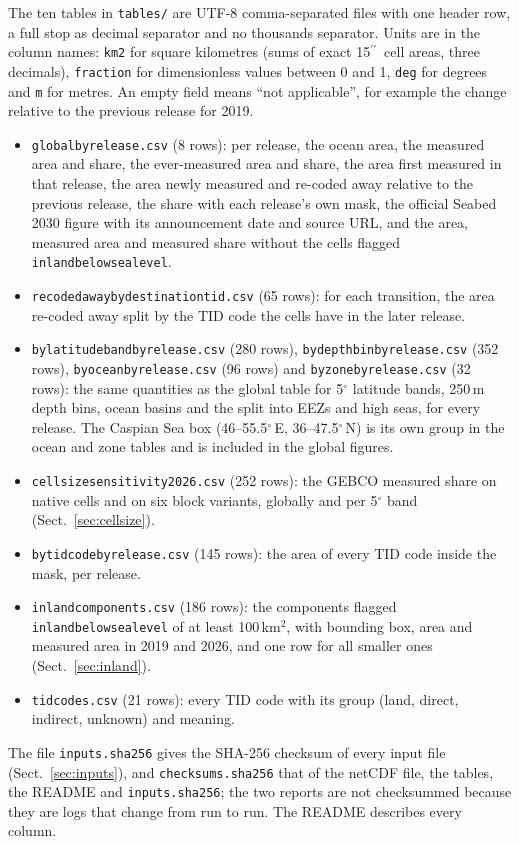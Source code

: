\documentclass[essd, manuscript]{copernicus}
\newcommand{\as}{$^{\prime\prime}$}      %
\renewcommand{\_}{\usorig\allowbreak}
\begin{document}
The ten tables in \texttt{tables/} are UTF-8 comma-separated files with one header row, a full stop as decimal separator and no thousands separator.
Units are in the column names: \texttt{\_km2} for square kilometres (sums of exact 15\as\ cell areas, three decimals), \texttt{\_fraction} for dimensionless values between 0 and 1, \texttt{\_deg} for degrees and \texttt{\_m} for metres.
An empty field means ``not applicable'', for example the change relative to the previous release for 2019.
\begin{itemize}
\item \texttt{global\_by\_release.csv} (8 rows): per release, the ocean area, the measured area and share, the ever-measured area and share, the area first measured in that release, the area newly measured and re-coded away relative to the previous release, the share with each release's own mask, the official Seabed 2030 figure with its announcement date and source URL, and the area, measured area and measured share without the cells flagged \texttt{inland\_below\_sea\_level}.
\item \texttt{recoded\_away\_by\_destination\_tid.csv} (65 rows): for each transition, the area re-coded away split by the TID code the cells have in the later release.
\item \texttt{by\_latitude\_band\_by\_release.csv} (280 rows), \texttt{by\_depth\_bin\_by\_release.csv} (352 rows), \texttt{by\_ocean\_by\_release.csv} (96 rows) and \texttt{by\_zone\_by\_release.csv} (32 rows): the same quantities as the global table for 5$^\circ$ latitude bands, 250\,m depth bins, ocean basins and the split into EEZs and high seas, for every release. The Caspian Sea box (46--55.5$^\circ$\,E, 36--47.5$^\circ$\,N) is its own group in the ocean and zone tables and is included in the global figures.
\item \texttt{cellsize\_sensitivity\_2026.csv} (252 rows): the GEBCO\_2026 measured share on native cells and on six block variants, globally and per 5$^\circ$ band (Sect.~\ref{sec:cellsize}).
\item \texttt{by\_tid\_code\_by\_release.csv} (145 rows): the area of every TID code inside the mask, per release.
\item \texttt{inland\_components.csv} (186 rows): the components flagged \texttt{inland\_below\_sea\_level} of at least 100\,km$^2$, with bounding box, area and measured area in 2019 and 2026, and one row for all smaller ones (Sect.~\ref{sec:inland}).
\item \texttt{tid\_codes.csv} (21 rows): every TID code with its group (land, direct, indirect, unknown) and meaning.
\end{itemize}
The file \texttt{inputs.sha256} gives the SHA-256 checksum of every input file (Sect.~\ref{sec:inputs}), and \texttt{checksums.sha256} that of the netCDF file, the tables, the README and \texttt{inputs.sha256}; the two reports are not checksummed because they are logs that change from run to run.
The README describes every column.
\end{document}
